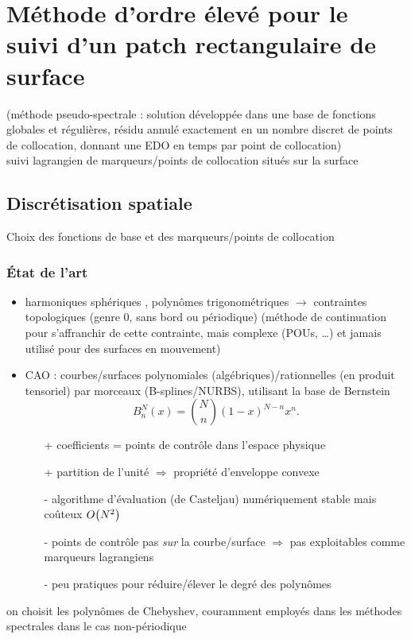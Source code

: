 \chapter{Méthode d'ordre élevé pour le suivi d'un patch rectangulaire de surface}
\label{chap:methode_ps}

(méthode pseudo-spectrale : solution développée dans une base de fonctions globales et régulières, résidu annulé exactement en un nombre discret de points de collocation, donnant une EDO en temps par point de collocation)\\

suivi lagrangien de marqueurs/points de collocation situés sur la surface

\section{Discrétisation spatiale}

Choix des fonctions de base et des marqueurs/points de collocation\\
\subsection{État de l'art}
\begin{itemize}
	\item harmoniques sphériques \cite{veerapaneni2011}, polynômes trigonométriques \cite{gueyffier2015} $\to$ contraintes topologiques (genre 0, sans bord ou périodique) (méthode de continuation \cite{bruno2007} pour s'affranchir de cette contrainte, mais complexe (POUs, \ldots) et jamais utilisé pour des surfaces en mouvement)
	\item CAO : courbes/surfaces polynomiales (algébriques)/rationnelles (en produit tensoriel) par morceaux (B-splines/NURBS), utilisant la base de Bernstein
	\begin{equation}
		B_n^N(x) = \binom{N}{n} \left( 1 - x \right)^{N-n} x^n.
	\end{equation}
	\begin{itemize}
		\item[+] coefficients = points de contrôle dans l'espace physique
		\item[+] partition de l'unité $\Rightarrow$ propriété d'enveloppe convexe
		\item[-] algorithme d'évaluation (de Casteljau) numériquement stable mais coûteux $O\!\left( {N^2} \right)$
		\item[-] points de contrôle pas \emph{sur} la courbe/surface $\Rightarrow$ pas exploitables comme marqueurs lagrangiens
		\item[-] peu pratiques pour réduire/élever le degré des polynômes
	\end{itemize}
\end{itemize}
\bigskip
on choisit les polynômes de Chebyshev, couramment employés dans les méthodes spectrales dans le cas non-périodique
